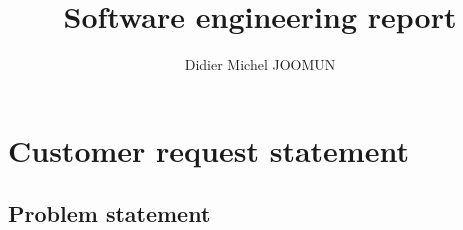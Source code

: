 \documentclass[a4paper,twoside]{article}
\begin{document}
\title{Software engineering report}
\author{Didier Michel JOOMUN}
\maketitle

\section{Customer request statement}
\subsection{Problem statement}
\end{document}
